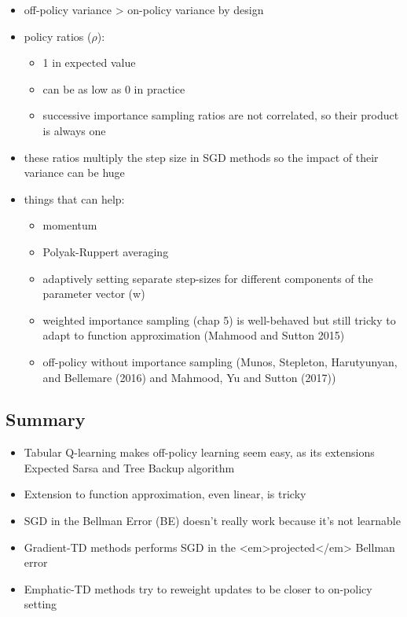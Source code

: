 \documentclass[sutton_barto_notes.tex]{subfiles}
\begin{document}
\begin{itemize}
\item off-policy variance > on-policy variance by design 
\item policy ratios ($\rho$):
    \begin{itemize}
    \item 1 in expected value 
    \item can be as low as 0 in practice 
    \item successive importance sampling ratios are not correlated, so their product is always one 
    \end{itemize}
   
\item these ratios multiply the step size in SGD methods so the impact of their variance can be huge 
\item things that can help:
    \begin{itemize}
    \item momentum 
    \item Polyak-Ruppert averaging 
    \item adaptively setting separate step-sizes for different components of the parameter vector (w) 
    \item weighted importance sampling (chap 5) is well-behaved but still tricky to adapt to function approximation (Mahmood and Sutton 2015) 
    \item off-policy without importance sampling (Munos, Stepleton, Harutyunyan, and Bellemare (2016) and Mahmood, Yu and Sutton (2017)) 
    \end{itemize}
   
\end{itemize}

\subsection{Summary}

\begin{itemize}
\item Tabular Q-learning makes off-policy learning seem easy, as its extensions Expected Sarsa and Tree Backup algorithm 
\item Extension to function approximation, even linear, is tricky 
\item SGD in the Bellman Error (BE) doesn’t really work because it’s not learnable 
\item Gradient-TD methods performs SGD in the <em>projected</em> Bellman error 
\item Emphatic-TD methods try to reweight updates to be closer to on-policy setting 
\end{itemize}
\end{document}
